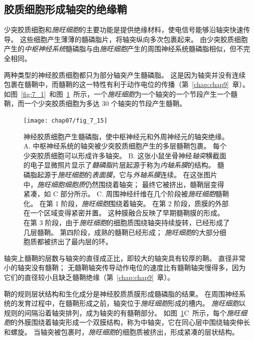 \subsection{胶质细胞形成轴突的绝缘鞘}

少突胶质细胞和\textit{施旺细胞}的主要功能是提供绝缘材料，使电信号能够沿轴突快速传导。
这些细胞产生薄薄的髓磷脂片，将轴突纵向多次包裹起来。
由少突胶质细胞产生的\textit{中枢神经系统}髓磷脂与由\textit{施旺细胞}产生的周围神经系统髓磷脂相似，但不完全相同。


两种类型的神经胶质细胞都只为部分轴突产生髓磷脂。
这是因为轴突并没有连续包裹在髓鞘中，而髓鞘的这一特性有利于动作电位的传播（第~\ref{chap:chap9}~章）。 
如图~\ref{fig:7_1}~和图~\ref{fig:7_15}~所示，一个\textit{施旺细胞}为一个轴突的一个节段产生一个髓鞘，而一个少突胶质细胞为多达 30 个轴突的节段产生髓鞘。


\begin{figure}[htbp]
	\centering
	\texttt{[image: chap07/fig\_7\_15]}
	\caption{神经胶质细胞产生髓磷脂，使中枢神经元和外周神经元的轴突绝缘。
		A. 中枢神经系统的轴突被少突胶质细胞产生的多层髓鞘包裹。
		每个少突胶质细胞可以形成许多轴突\cite{raine1984morphology}。
		B. 这张小鼠坐骨神经\textit{轴突}横截面的电子显微照片显示了\textit{髓磷脂}片层起源于称为\textit{内轴系膜}的结构。
		髓磷脂起源于\textit{施旺细胞}的\textit{表面膜}，它与\textit{外轴系膜}连续。
		在这张图片中，\textit{施旺细胞细胞质}仍然围绕着轴突；
		最终它被挤出，髓鞘层变得紧凑，如 C 部分所示\cite{thomas1984clinical}。
		C. 周围神经纤维在几个阶段被\textit{施旺细胞}髓鞘化。
		在第 1 阶段，\textit{施旺细胞}围绕着轴突。
		在第 2 阶段，质膜的外部在一个区域变得紧密并置。
		这种膜融合反映了早期髓鞘膜的形成。
		在第 3 阶段，由于\textit{施旺细胞}的细胞质围绕轴突持续旋转，已经形成了几层髓鞘。
		第四阶段，成熟的髓鞘已经形成；
		\textit{施旺细胞}的大部分细胞质都被挤出了最内层的环\cite{williams1989bannister}。}
	\label{fig:7_15}
\end{figure}


轴突上髓鞘的层数与轴突的直径成正比，即较大的轴突具有较厚的鞘。
直径非常小的轴突没有髓鞘；
无髓鞘轴突传导动作电位的速度比有髓鞘轴突慢得多，因为它们的直径较小且缺乏髓鞘绝缘（第~\ref{chap:chap9}~章）。


鞘的规则层状结构和生化成分是神经胶质质膜形成髓磷脂的结果。
在周围神经系统的发育过程中，在髓鞘形成之前，轴突位于\textit{施旺细胞}形成的槽内。
\textit{施旺细胞}以规则的间隔沿着轴突排列，成为轴突的有髓鞘部分。
如图~\ref{fig:7_15}C~所示，每个\textit{施旺细胞}的外膜围绕着轴突形成一个双膜结构，称为中轴突，它在同心层中围绕轴突伸长和螺旋。
当轴突被包裹时，\textit{施旺细胞}的细胞质被挤出，形成紧凑的层状结构。


